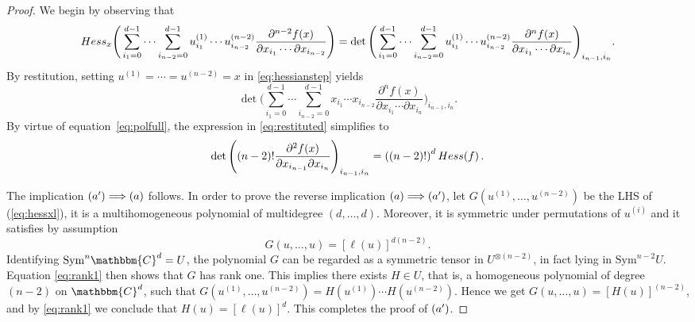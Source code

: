 \documentclass[10pt,a4paper]{amsart}
\def\Hess{{\rm Hess}}
\begin{document}
\begin{proof}
We begin by observing that
\begin{equation}\label{eq:hessianstep}
\Hess_x\Bigg(\sum_{i_1=0}^{d-1}\cdots\sum_{i_{n-2}=0}^{d-1} u^{(1)}_{i_1}\cdots u^{(n-2)}_{i_{n-2}}
\frac{\partial^{n-2}f(x)}{\partial x_{i_1}\cdots\partial {x_{i_{n-2}}}}\Bigg)=
\det\Bigg(\sum_{i_1=0}^{d-1}\cdots\sum_{i_{n-2}=0}^{d-1} u^{(1)}_{i_1}\cdots u^{(n-2)}_{i_{n-2}}
\frac{\partial^{n}f(x)}{\partial x_{i_1}\cdots\partial {x_{i_{n}}}}\Bigg)_{i_{n-1},i_n}.
\end{equation}
By restitution, setting $u^{(1)}=\cdots=u^{(n-2)}=x$ in \eqref{eq:hessianstep} yields
\begin{equation}\label{eq:restituted}
\det\Bigg(\sum_{i_1=0}^{d-1}\cdots\sum_{i_{n-2}=0}^{d-1} x_{i_1}\cdots x_{i_{n-2}}
\frac{\partial^{n}f(x)}{\partial x_{i_1}\cdots\partial {x_{i_{n}}}}\Bigg)_{i_{n-1},i_n}.
\end{equation}
By virtue of equation~\eqref{eq:polfull}, the expression in \eqref{eq:restituted} simplifies to
\begin{equation}
\det\Bigg((n-2)!
\frac{\partial^{2}f(x)}{\partial x_{i_{n-1}}\partial {x_{i_{n}}}}\Bigg)_{i_{n-1},i_n}=\left((n-2)!\right)^d\Hess(f)\,.
\end{equation}

The implication $(\textnormal{a}^{\prime}) \Longrightarrow (\textnormal{a})$ follows. In order to prove the reverse implication $(\textnormal{a}) \Longrightarrow (\textnormal{a}^{\prime})$, let $G(u^{(1)},\ldots, u^{(n-2)})$ be the LHS of (\ref{eq:hessxl}), it is a multihomogeneous polynomial of multidegree $(d,\ldots, d)$. Moreover, it is symmetric under permutations of $u^{(i)}$ and it satisfies by assumption
\begin{equation}\label{eq:rank1}
G(u,\ldots, u)=\left[\ell(u)\right]^{d(n-2)}.
\end{equation}
Identifying $\mathrm{Sym}^n \mathbbm{C}^d = U$, the polynomial $G$ can be regarded as a symmetric tensor in $U^{\otimes(n-2)}$, in fact lying in $\mathrm{Sym}^{n-2} U$. Equation \eqref{eq:rank1} then shows that $G$ has rank one. This implies there exists $H \in U$, that is, a homogeneous polynomial of degree $(n-2)$ on $\mathbbm{C}^d$, such that $G(u^{(1)},\ldots, u^{(n-2)})=H(u^{(1)})\cdots H(u^{(n-2)})$. Hence we get $G(u,\ldots,u)=[H(u)]^{(n-2)}$, and by \eqref{eq:rank1} we conclude that $H(u) = [\ell(u)]^d$. This completes the proof of $(\textnormal{a}^{\prime})$.
\end{proof}
\end{document}
